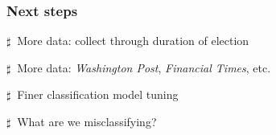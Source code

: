 \documentclass[11pt]{beamer}
\newenvironment{innerlist}[1][\enskip\textbullet]%
        {\begin{compactenum}[#1]}{\end{compactenum}}
\begin{document}
\begin{frame}
\frametitle{Next steps}

\vspace{5mm}

\begin{innerlist}
	\item[$\sharp~$] More data: collect through duration of election
	\vspace{4mm}
	\item[$\sharp~$] More data: {\it Washington Post}, {\it Financial Times}, etc.
	\vspace{4mm}
	\item[$\sharp~$] Finer classification model tuning 
	\vspace{4mm}
	\item[$\sharp~$] What are we misclassifying? 
\end{innerlist}

\end{frame}

\end{document}

